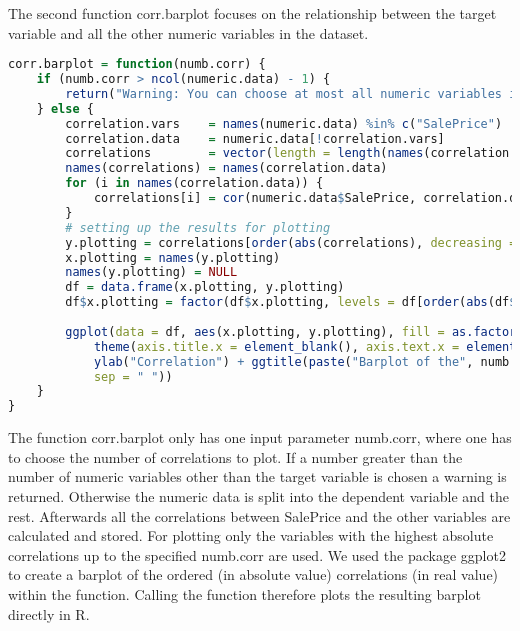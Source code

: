 The second function corr.barplot focuses on the relationship between the target variable and all the other numeric variables in the dataset. 
\begin{lstlisting}[language=R]
corr.barplot = function(numb.corr) {
    if (numb.corr > ncol(numeric.data) - 1) {
        return("Warning: You can choose at most all numeric variables in the dataset except the target variable SalePrice, which is already implemented as default value")
    } else {
        correlation.vars    = names(numeric.data) %in% c("SalePrice")
        correlation.data    = numeric.data[!correlation.vars]                  # subsetting the numeric variables to not contain the target variable
        correlations        = vector(length = length(names(correlation.data))) # setting up vector for results (correlations)
        names(correlations) = names(correlation.data)
        for (i in names(correlation.data)) {                                   # calculating all bivariate correlations
            correlations[i] = cor(numeric.data$SalePrice, correlation.data[i], use = "pairwise.complete.obs")
        }
        # setting up the results for plotting
        y.plotting = correlations[order(abs(correlations), decreasing = TRUE)][1:numb.corr]
        x.plotting = names(y.plotting)
        names(y.plotting) = NULL
        df = data.frame(x.plotting, y.plotting)
        df$x.plotting = factor(df$x.plotting, levels = df[order(abs(df$y.plotting), decreasing = TRUE), "x.plotting"])
        
        ggplot(data = df, aes(x.plotting, y.plotting), fill = as.factor(x.plotting)) + geom_bar(stat = "identity") + 
            theme(axis.title.x = element_blank(), axis.text.x = element_text(angle = 90, vjust = 0.5, size = 12)) + 
            ylab("Correlation") + ggtitle(paste("Barplot of the", numb.corr, "highest bivariate correlations with SalePrice", 
            sep = " "))
    }
}
\end{lstlisting}
The function corr.barplot only has one input parameter numb.corr, where one has to choose the number of correlations to plot. If a number greater than the number of numeric variables other than the target variable is chosen a warning  is returned. Otherwise the numeric data is split into the dependent variable and the rest. Afterwards all the correlations between SalePrice and the other variables are calculated and stored. For plotting only the variables with the highest absolute correlations up to the specified numb.corr are used. We used the package ggplot2 to create a barplot of the ordered (in absolute value) correlations (in real value) within the function. Calling the function therefore plots the resulting barplot directly in \textsf{R}. \\
